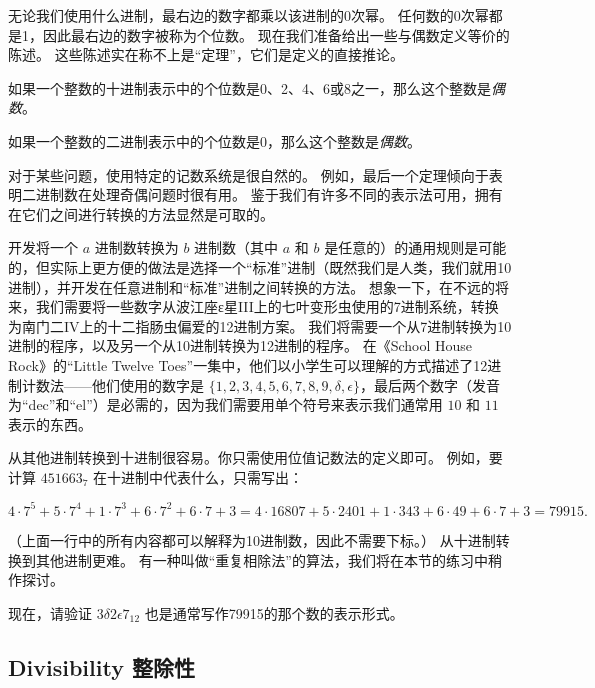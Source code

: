 无论我们使用什么进制，最右边的数字都乘以该进制的0次幂。
任何数的0次幂都是1，因此最右边的数字被称为个位数。
现在我们准备给出一些与偶数定义等价的陈述。
这些陈述实在称不上是“定理”，它们是定义的直接推论。

\begin{thm}

  如果一个整数的十进制表示中的个位数是0、2、4、6或8之一，那么这个整数是{\em 偶数}。
\end{thm}

\begin{thm}
 
  如果一个整数的二进制表示中的个位数是0，那么这个整数是{\em 偶数}。
\end{thm}

\vspace{.5 in}

对于某些问题，使用特定的记数系统是很自然的。
例如，最后一个定理倾向于表明二进制数在处理奇偶问题时很有用。
鉴于我们有许多不同的表示法可用，拥有在它们之间进行转换的方法显然是可取的。

开发将一个 $a$ 进制数转换为 $b$ 进制数（其中 $a$ 和 $b$ 是任意的）的通用规则是可能的，但实际上更方便的做法是选择一个“标准”进制（既然我们是人类，我们就用10进制），并开发在任意进制和“标准”进制之间转换的方法。
想象一下，在不远的将来，我们需要将一些数字从波江座ε星III上的七叶变形虫使用的7进制系统，转换为南门二IV上的十二指肠虫偏爱的12进制方案。
我们将需要一个从7进制转换为10进制的程序，以及另一个从10进制转换为12进制的程序。
在《School House Rock》的“Little Twelve Toes”一集中，他们以小学生可以理解的方式描述了12进制计数法——他们使用的数字是 $\{1, 2, 3, 4, 5, 6, 7, 8, 9, \delta, \epsilon \}$，最后两个数字（发音为“dec”和“el”）是必需的，因为我们需要用单个符号来表示我们通常用 $10$ 和 $11$ 表示的东西。

从其他进制转换到十进制很容易。你只需使用位值记数法的定义即可。
例如，要计算 $451663_7$ 在十进制中代表什么，只需写出：

\[ 4 \cdot 7^5 + 5 \cdot 7^4 + 1 \cdot 7^3 + 6 \cdot 7^2 + 6 \cdot 7 + 3 =  4 \cdot 16807 + 5 \cdot 2401 + 1 \cdot 343 + 6 \cdot 49 + 6 \cdot 7 + 3 = 79915. \]

（上面一行中的所有内容都可以解释为10进制数，因此不需要下标。）
从十进制转换到其他进制更难。
有一种叫做“重复相除法”的算法，我们将在本节的练习中稍作探讨。

现在，请验证 $3\delta 2\epsilon 7_{12}$ 也是通常写作79915的那个数的表示形式。

\subsection{Divisibility 整除性}
\label{div}

